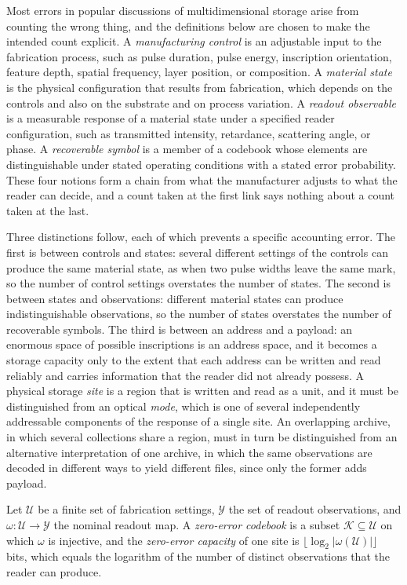 Most errors in popular discussions of multidimensional storage arise from counting the wrong thing, and the definitions below are chosen to make the intended count explicit. A \emph{manufacturing control} is an adjustable input to the fabrication process, such as pulse duration, pulse energy, inscription orientation, feature depth, spatial frequency, layer position, or composition. A \emph{material state} is the physical configuration that results from fabrication, which depends on the controls and also on the substrate and on process variation. A \emph{readout observable} is a measurable response of a material state under a specified reader configuration, such as transmitted intensity, retardance, scattering angle, or phase. A \emph{recoverable symbol} is a member of a codebook whose elements are distinguishable under stated operating conditions with a stated error probability. These four notions form a chain from what the manufacturer adjusts to what the reader can decide, and a count taken at the first link says nothing about a count taken at the last.

Three distinctions follow, each of which prevents a specific accounting error. The first is between controls and states: several different settings of the controls can produce the same material state, as when two pulse widths leave the same mark, so the number of control settings overstates the number of states. The second is between states and observations: different material states can produce indistinguishable observations, so the number of states overstates the number of recoverable symbols. The third is between an address and a payload: an enormous space of possible inscriptions is an address space, and it becomes a storage capacity only to the extent that each address can be written and read reliably and carries information that the reader did not already possess. A physical storage \emph{site} is a region that is written and read as a unit, and it must be distinguished from an optical \emph{mode}, which is one of several independently addressable components of the response of a single site. An overlapping archive, in which several collections share a region, must in turn be distinguished from an alternative interpretation of one archive, in which the same observations are decoded in different ways to yield different files, since only the former adds payload.

\begin{definition}\label{def:capacity}
Let $\mathcal U$ be a finite set of fabrication settings, $\mathcal Y$ the set of readout observations, and $\omega:\mathcal U\to\mathcal Y$ the nominal readout map. A \emph{zero-error codebook} is a subset $\mathcal K\subseteq\mathcal U$ on which $\omega$ is injective, and the \emph{zero-error capacity} of one site is $\lfloor\log_2 |\omega(\mathcal U)|\rfloor$ bits, which equals the logarithm of the number of distinct observations that the reader can produce.
\end{definition}

